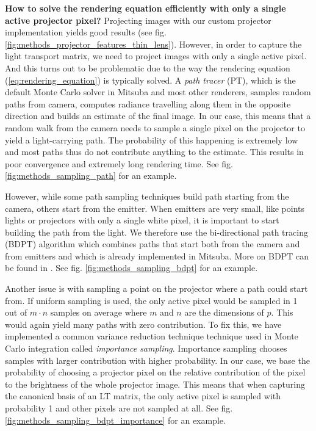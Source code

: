 \textbf{How to solve the rendering equation efficiently with only a single active projector pixel?} Projecting images with our custom projector implementation yields good results (see fig. \ref{fig:methods_projector_features_thin_lens}). However, in order to capture the light transport matrix, we need to project images with only a single active pixel. And this turns out to be problematic due to the way the rendering equation (\ref{eq:rendering_equation}) is typically solved. A \textit{path tracer} (PT), which is the default Monte Carlo solver in Mitsuba and most other renderers, samples random paths from camera, computes radiance travelling along them in the opposite direction and builds an estimate of the final image. In our case, this means that a random walk from the camera needs to sample a single pixel on the projector to yield a light-carrying path. The probability of this happening is extremely low and most paths thus do not contribute anything to the estimate. This results in poor convergence and extremely long rendering time. See fig. \ref{fig:methods_sampling_path} for an example.

However, while some path sampling techniques build path starting from the camera, others start from the emitter. When emitters are very small, like points lights or projectors with only a single white pixel, it is important to start building the path from the light. We therefore use the bi-directional path tracing (BDPT) algorithm which combines paths that start both from the camera and from emitters and which is already implemented in Mitsuba. More on BDPT can be found in \citet{Veach1997}. See fig. \ref{fig:methods_sampling_bdpt} for an example.

Another issue is with sampling a point on the projector where a path could start from. If uniform sampling is used, the only active pixel would be sampled in 1 out of \(m \cdot n\) samples on average where \(m\) and \(n\) are the dimensions of \(p\). This would again yield many paths with zero contribution. To fix this, we have implemented a common variance reduction technique technique used in Monte Carlo integration called \textit{importance sampling}. Importance sampling chooses samples with larger contribution with higher probability. In our case, we base the probability of choosing a projector pixel on the relative contribution of the pixel to the brightness of the whole projector image. This means that when capturing the canonical basis of an LT matrix, the only active pixel is sampled with probability 1 and other pixels are not sampled at all. See fig. \ref{fig:methods_sampling_bdpt_importance} for an example.

